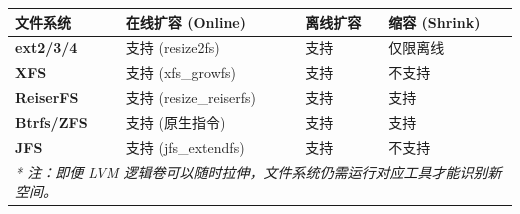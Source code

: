 \documentclass[multi=page, border=15pt, varwidth=16cm]{standalone}
\newcommand{\thnode}[1]{\textcolor{headertext}{\bfseries #1}}
\begin{document}
\sffamily
\renewcommand{\arraystretch}{1.3}

\begin{page}
	\centering
	\setlength{\tabcolsep}{8pt} %
	\begin{tabular}{llll}
		\toprule
		\rowcolor{headerbg}
		\thnode{文件系统}      & \thnode{在线扩容 (Online)}                     & \thnode{离线扩容} & \thnode{缩容 (Shrink)}        \\
		\midrule
		\textbf{ext2/3/4}  & \color{blue!70!black}支持 (resize2fs)        & 支持            & \color{orange!80!black}仅限离线 \\
		\textbf{XFS}       & \color{blue!70!black}支持 (xfs\_growfs)      & 支持            & \color{red!70!black}不支持     \\
		\textbf{ReiserFS}  & \color{blue!70!black}支持 (resize\_reiserfs) & 支持            & \color{blue!70!black}支持     \\
		\textbf{Btrfs/ZFS} & \color{blue!70!black}支持 (原生指令)             & 支持            & \color{blue!70!black}支持     \\
		\textbf{JFS}       & \color{blue!70!black}支持 (jfs\_extendfs)    & 支持            & \color{red!70!black}不支持     \\
		\bottomrule
		\multicolumn{4}{p{12.5cm}}{\scriptsize \color{gray}\textit{* 注：即便 LVM 逻辑卷可以随时拉伸，文件系统仍需运行对应工具才能识别新空间。}}
	\end{tabular}
\end{page}
\end{document}
